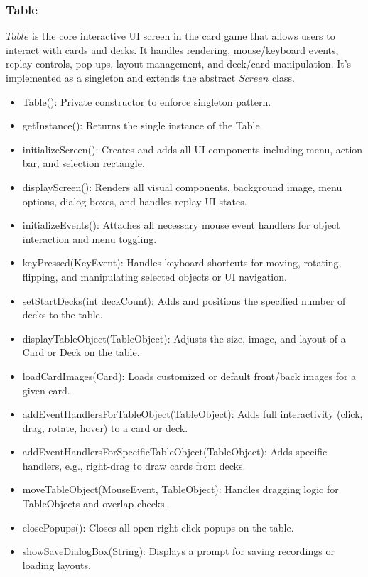\documentclass[a4paper]{project}
\begin{document}
			\subsubsection{Table}\label{subsubsec:table}
				
				$Table$ is the core interactive UI screen in the card game that allows users to interact with cards and decks. It handles rendering, mouse/keyboard events, replay controls, pop-ups, layout management, and deck/card manipulation. It's implemented as a singleton and extends the abstract $Screen$ class.
			
				\begin{itemize}
					\item Table(): Private constructor to enforce singleton pattern.
					\item getInstance(): Returns the single instance of the Table.
					\item initializeScreen(): Creates and adds all UI components including menu, action bar, and selection rectangle.
					\item displayScreen(): Renders all visual components, background image, menu options, dialog boxes, and handles replay UI states.
					\item initializeEvents(): Attaches all necessary mouse event handlers for object interaction and menu toggling.
					\item keyPressed(KeyEvent): Handles keyboard shortcuts for moving, rotating, flipping, and manipulating selected objects or UI navigation.
					\item setStartDecks(int deckCount): Adds and positions the specified number of decks to the table.
					\item displayTableObject(TableObject): Adjusts the size, image, and layout of a Card or Deck on the table.
					\item loadCardImages(Card): Loads customized or default front/back images for a given card.
					\item addEventHandlersForTableObject(TableObject): Adds full interactivity (click, drag, rotate, hover) to a card or deck.
					\item addEventHandlersForSpecificTableObject(TableObject): Adds specific handlers, e.g., right-drag to draw cards from decks.
					\item moveTableObject(MouseEvent, TableObject): Handles dragging logic for TableObjects and overlap checks.
					\item closePopups(): Closes all open right-click popups on the table.
					\item showSaveDialogBox(String): Displays a prompt for saving recordings or loading layouts.

\end{itemize}
\end{document}
